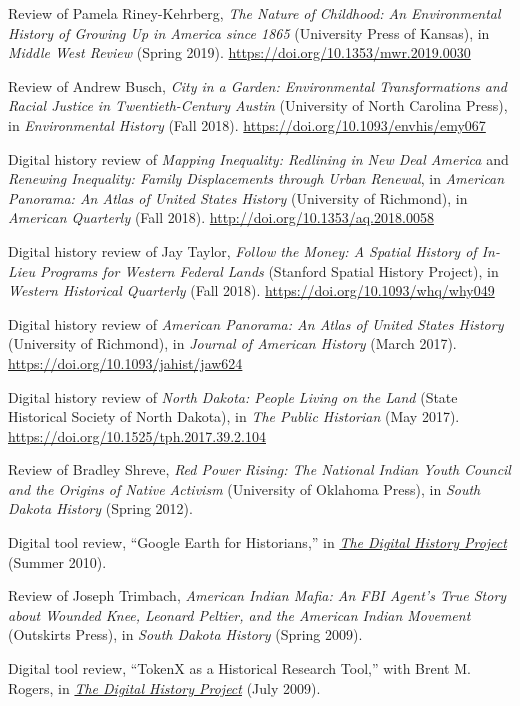 Review of Pamela Riney-Kehrberg, \emph{The Nature of Childhood: An
Environmental History of Growing Up in America since 1865} (University
Press of Kansas), in \emph{Middle West Review} (Spring 2019).
\url{https://doi.org/10.1353/mwr.2019.0030}

Review of Andrew Busch, \emph{City in a Garden: Environmental
Transformations and Racial Justice in Twentieth-Century Austin}
(University of North Carolina Press), in \emph{Environmental History}
(Fall 2018). \url{https://doi.org/10.1093/envhis/emy067}

Digital history review of \emph{Mapping Inequality: Redlining in New
Deal America} and \emph{Renewing Inequality: Family Displacements
through Urban Renewal}, in \emph{American Panorama: An Atlas of United
States History} (University of Richmond), in \emph{American Quarterly}
(Fall 2018). \url{http://doi.org/10.1353/aq.2018.0058}

Digital history review of Jay Taylor, \emph{Follow the Money: A Spatial
History of In-Lieu Programs for Western Federal Lands} (Stanford Spatial
History Project), in \emph{Western Historical Quarterly} (Fall 2018).
\url{https://doi.org/10.1093/whq/why049}

Digital history review of \emph{American Panorama: An Atlas of United
States History} (University of Richmond), in \emph{Journal of American
History} (March 2017). \url{https://doi.org/10.1093/jahist/jaw624}

Digital history review of \emph{North Dakota: People Living on the Land}
(State Historical Society of North Dakota), in \emph{The Public
Historian} (May 2017). \url{https://doi.org/10.1525/tph.2017.39.2.104}

Review of Bradley Shreve, \emph{Red Power Rising: The National Indian
Youth Council and the Origins of Native Activism} (University of
Oklahoma Press), in \emph{South Dakota History} (Spring 2012).

Digital tool review, ``Google Earth for Historians,'' in
\emph{\href{http://digitalhistory.unl.edu/t-reviews/geheppler.php}{The
Digital History Project}} (Summer 2010).

Review of Joseph Trimbach, \emph{American Indian Mafia: An FBI Agent's
True Story about Wounded Knee, Leonard Peltier, and the American Indian
Movement} (Outskirts Press), in \emph{South Dakota History} (Spring
2009).

Digital tool review, ``TokenX as a Historical Research Tool,'' with
Brent M. Rogers, in
\emph{\href{http://digitalhistory.unl.edu/t-reviews/tokenxhepplerrogers.php}{The
Digital History Project}} (July 2009).


